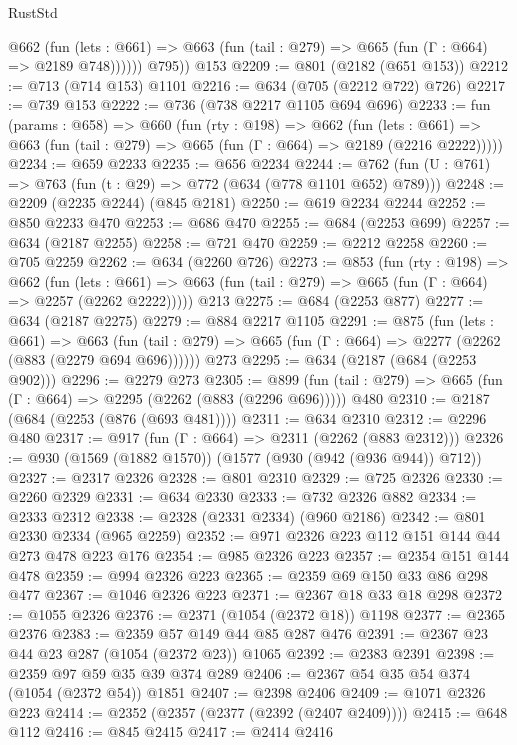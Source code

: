 \begin{lexlean}{RustStd}
\begin{coremodule}
{\begin{coremodule}
{{{{{{{{            @662
              (fun (lets : @661) =>
              @663 (fun (tail : @279) => @665 (fun (Γ : @664) => @2189 @748))))))
        @795))
    @153
@2209 := @801 (@2182 (@651 @153))
@2212 := @713 (@714 @153) @1101
@2216 := @634 (@705 (@2212 @722) @726)
@2217 := @739 @153
@2222 := @736 (@738 @2217 @1105 @694 @696)
@2233 := fun (params : @658) =>
  @660
    (fun (rty : @198) =>
    @662
      (fun (lets : @661) =>
      @663 (fun (tail : @279) => @665 (fun (Γ : @664) => @2189 (@2216 @2222)))))
@2234 := @659 @2233
@2235 := @656 @2234
@2244 := @762 (fun (U : @761) => @763 (fun (t : @29) => @772 (@634 (@778 @1101 @652) @789)))
@2248 := @2209 (@2235 @2244) (@845 @2181)
@2250 := @619 @2234 @2244
@2252 := @850 @2233 @470
@2253 := @686 @470
@2255 := @684 (@2253 @699)
@2257 := @634 (@2187 @2255)
@2258 := @721 @470
@2259 := @2212 @2258
@2260 := @705 @2259
@2262 := @634 (@2260 @726)
@2273 := @853
    (fun (rty : @198) =>
    @662
      (fun (lets : @661) =>
      @663 (fun (tail : @279) => @665 (fun (Γ : @664) => @2257 (@2262 @2222)))))
    @213
@2275 := @684 (@2253 @877)
@2277 := @634 (@2187 @2275)
@2279 := @884 @2217 @1105
@2291 := @875
    (fun (lets : @661) =>
    @663 (fun (tail : @279) => @665 (fun (Γ : @664) => @2277 (@2262 (@883 (@2279 @694 @696))))))
    @273
@2295 := @634 (@2187 (@684 (@2253 @902)))
@2296 := @2279 @273
@2305 := @899 (fun (tail : @279) => @665 (fun (Γ : @664) => @2295 (@2262 (@883 (@2296 @696))))) @480
@2310 := @2187 (@684 (@2253 (@876 (@693 @481))))
@2311 := @634 @2310
@2312 := @2296 @480
@2317 := @917 (fun (Γ : @664) => @2311 (@2262 (@883 @2312)))
@2326 := @930 (@1569 (@1882 @1570)) (@1577 (@930 (@942 (@936 @944)) @712))
@2327 := @2317 @2326
@2328 := @801 @2310
@2329 := @725 @2326
@2330 := @2260 @2329
@2331 := @634 @2330
@2333 := @732 @2326 @882
@2334 := @2333 @2312
@2338 := @2328 (@2331 @2334) (@960 @2186)
@2342 := @801 @2330 @2334 (@965 @2259)
@2352 := @971 @2326 @223 @112 @151 @144 @44 @273 @478 @223 @176
@2354 := @985 @2326 @223
@2357 := @2354 @151 @144 @478
@2359 := @994 @2326 @223
@2365 := @2359 @69 @150 @33 @86 @298 @477
@2367 := @1046 @2326 @223
@2371 := @2367 @18 @33 @18 @298
@2372 := @1055 @2326
@2376 := @2371 (@1054 (@2372 @18)) @1198
@2377 := @2365 @2376
@2383 := @2359 @57 @149 @44 @85 @287 @476
@2391 := @2367 @23 @44 @23 @287 (@1054 (@2372 @23)) @1065
@2392 := @2383 @2391
@2398 := @2359 @97 @59 @35 @39 @374 @289
@2406 := @2367 @54 @35 @54 @374 (@1054 (@2372 @54)) @1851
@2407 := @2398 @2406
@2409 := @1071 @2326 @223
@2414 := @2352 (@2357 (@2377 (@2392 (@2407 @2409))))
@2415 := @648 @112
@2416 := @845 @2415
@2417 := @2414 @2416
}}}}}}}}
\end{coremodule}}
\end{coremodule}
\end{lexlean}
